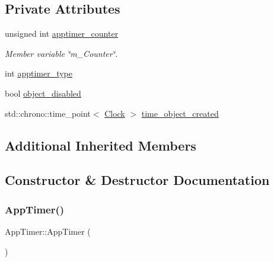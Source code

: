 \subsection*{Private Attributes}
\begin{DoxyCompactItemize}
\item 
unsigned int \mbox{\hyperlink{classAppTimer_addd53e74f8e65e44430bd20483592f98}{apptimer\+\_\+counter}}
\begin{DoxyCompactList}\small\item\em Member variable \char`\"{}m\+\_\+\+Counter\char`\"{}. \end{DoxyCompactList}\item 
int \mbox{\hyperlink{classAppTimer_a96accb68b0b4d0f0477d230b6965c460}{apptimer\+\_\+type}}
\item 
bool \mbox{\hyperlink{classAppTimer_aa16315b1eff51bc0561c9c5bf024bcc2}{object\+\_\+disabled}}
\item 
std\+::chrono\+::time\+\_\+point$<$ \mbox{\hyperlink{universe_8h_a0ef8d951d1ca5ab3cfaf7ab4c7a6fd80}{Clock}} $>$ \mbox{\hyperlink{classAppTimer_aae18c05cc314b40c572fbf674a01ac40}{time\+\_\+object\+\_\+created}}
\end{DoxyCompactItemize}
\subsection*{Additional Inherited Members}


\subsection{Constructor \& Destructor Documentation}
\mbox{\label{classAppTimer_a59bf4eccdc9a3e16745b2cf9a122f935}} 
\subsubsection{\texorpdfstring{App\+Timer()}{AppTimer()}\hspace{0.1cm}{\footnotesize\ttfamily [1/4]}}
{\footnotesize\ttfamily App\+Timer\+::\+App\+Timer (\begin{DoxyParamCaption}{ }\end{DoxyParamCaption})\hspace{0.3cm}{\ttfamily [inline]}}

\mbox{\label{classAppTimer_a06df15e33135f60f661c231e067951f3}} 
